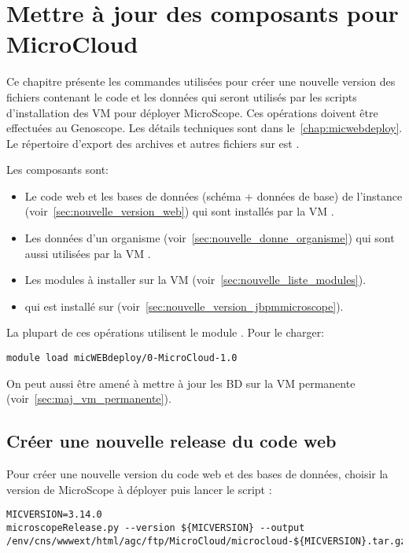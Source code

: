 \chapter{Mettre à jour des composants pour MicroCloud} \label{chap:creer_nouvelle_version}

Ce chapitre présente les commandes utilisées pour créer une nouvelle version
des fichiers contenant le code et les données qui seront utilisés
par les scripts d'installation des VM pour déployer MicroScope.
Ces opérations doivent être effectuées au Genoscope.
Les détails techniques sont dans le~\autoref{chap:micwebdeploy}.
Le répertoire d'export des archives et autres fichiers sur  est .

Les composants sont:
\begin{itemize}
    \item Le code web et les bases de données (schéma + données de base) de l'instance (voir~\autoref{sec:nouvelle_version_web})
          qui sont installés par la VM .
    \item Les données d'un organisme (voir~\autoref{sec:nouvelle_donne_organisme})
          qui sont aussi utilisées par la VM .
    \item Les modules à installer sur la VM  (voir~\autoref{sec:nouvelle_liste_modules}).
    \item {} qui est installé sur  (voir~\autoref{sec:nouvelle_version_jbpmmicroscope}).
\end{itemize}

La plupart de ces opérations utilisent le module \micWEBdeployVer.
Pour le charger:
\begin{lstlisting}[style=bash]
module load micWEBdeploy/0-MicroCloud-1.0
\end{lstlisting}

On peut aussi être amené à mettre à jour les BD sur la VM permanente (voir~\autoref{sec:maj_vm_permanente}).

\section{Créer une nouvelle release du code web} \label{sec:nouvelle_version_web}

Pour créer une nouvelle version du code web et des bases de données, choisir la version de MicroScope à déployer puis lancer le script  :
\begin{lstlisting}[style=bash]
MICVERSION=3.14.0
microscopeRelease.py --version ${MICVERSION} --output /env/cns/wwwext/html/agc/ftp/MicroCloud/microcloud-${MICVERSION}.tar.gz
\end{lstlisting}

